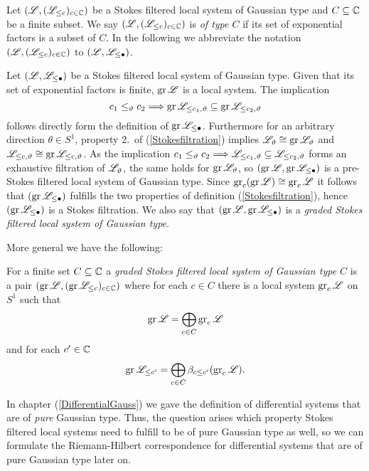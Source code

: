 \begin{nota}
    Let $(\mathscr{L}, (\mathscr{L}_{\leq c})_{c \in \mathbb{C}})$ be a Stokes filtered local system of Gaussian type and $C \subseteq \mathbb{C}$ be a finite subset. We say $(\mathscr{L}, (\mathscr{L}_{\leq c})_{c \in \mathbb{C}})$ is \emph{of type $C$} if its set of exponential factors is a subset of $C$. In the following we abbreviate the notation $(\mathscr{L}, (\mathscr{L}_{\leq c})_{c \in \mathbb{C}})$ to $(\mathscr{L}, \mathscr{L}_{\leq \bullet})$.
\end{nota}

\begin{ex}\label{gradedLoSys}
    Let $(\mathscr{L}, \mathscr{L}_{\leq \bullet})$ be a Stokes filtered local system of Gaussian type. Given that its set of exponential factors is finite, $\operatorname{gr} \mathscr{L}$ is a local system. The implication 
    \[
    c_1 \leq_{\vartheta} c_2 \Longrightarrow \operatorname{gr}\mathscr{L}_{\leq c_1,\vartheta} \subseteq \operatorname{gr}\mathscr{L}_{\leq c_2, \vartheta} 
    \]
    follows directly form the definition of $\operatorname{gr}\mathscr{L}_{\leq \bullet}$.  Furthermore for an arbitrary direction $\theta \in S^1$, property 2.\ of (\ref{Stokesfiltration}) implies $\mathscr{L}_\vartheta \cong \operatorname{gr}\mathscr{L}_\vartheta$ and $\mathscr{L}_{\leq c, \vartheta} \cong \operatorname{gr}\mathscr{L}_{\leq c, \vartheta}$. As the implication $c_1 \leq_\vartheta c_2 \Longrightarrow \mathscr{L}_{\leq c_1,\vartheta} \subseteq \mathscr{L}_{\leq c_2, \vartheta}$
    forms an exhaustive filtration of $\mathscr{L}_{\vartheta}$, the same holds for $\operatorname{gr}\mathscr{L}_{\vartheta}$, so $(\operatorname{gr} \mathscr{L}, \operatorname{gr} \mathscr{L}_{\leq \bullet})$ is a pre-Stokes filtered local system of Gaussian type. Since $\operatorname{gr}_c(\operatorname{gr} \mathscr{L}) \cong \operatorname{gr}_c\mathscr{L}$ it follows that $(\operatorname{gr}\mathscr{L}_{\leq \bullet})$ fulfills the two properties of definition (\ref{Stokesfiltration}), hence $(\operatorname{gr}\mathscr{L}_{\leq \bullet})$ is a Stokes filtration. We also say that $(\operatorname{gr}\mathscr{L}, \operatorname{gr}\mathscr{L}_{\leq \bullet})$ is a \emph{graded Stokes filtered local system of Gaussian type}.
\end{ex}
More general we have the following: 
\begin{defi}\label{gradedLoSysDef}
    For a finite set $C \subseteq \mathbb{C}$ a \emph{graded Stokes filtered local system of Gaussian type $C$} is a pair $(\operatorname{gr}\mathscr{L}, (\operatorname{gr}\mathscr{L}_{\leq c})_{c \in \mathbb{C}})$ where for each $c \in C$ there is a local system $\operatorname{gr}_c\mathscr{L}$ on $S^1$ such that 
    \[\operatorname{gr}\mathscr{L} = \bigoplus_{c \in C} \operatorname{gr}_c\mathscr{L} \] and for each $c' \in \mathbb{C}$ 
    \[\operatorname{gr}\mathscr{L}_{\leq c'} = \bigoplus_{c \in C} \beta_{c \leq c'}(\operatorname{gr}_c\mathscr{L}).\]
\end{defi}

In chapter (\ref{DifferentialGauss}) we gave the definition of differential systems that are of \emph{pure} Gaussian type. Thus, the question arises which property Stokes filtered local systems need to fulfill to be of pure Gaussian type as well, so we can formulate the Riemann-Hilbert correspondence 
for differential systems that are of pure Gaussian type later on.

